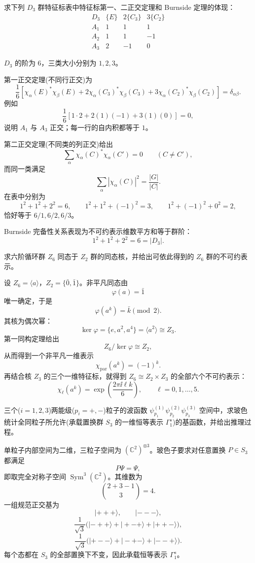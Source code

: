 \begin{question}[9 分]
求下列 $D_3$ 群特征标表中特征标第一、二正交定理和 Burnside 定理的体现：
\[
\begin{array}{c|ccc}
D_3&\{E\}&2\{C_3\}&3\{C_2\}\\\hline
A_1&1&1&1\\
A_2&1&1&-1\\
A_3&2&-1&0
\end{array}
\]
\begin{solution}
$D_3$ 的阶为 $6$，三类大小分别为 $1,2,3$。

第一正交定理(不同行正交)为
\[
\frac1{6}\left[
\chi_\alpha(E)^*\chi_\beta(E)
+2\chi_\alpha(C_3)^*\chi_\beta(C_3)
+3\chi_\alpha(C_2)^*\chi_\beta(C_2)
\right]=\delta_{\alpha\beta}.
\]
例如
\[
\frac16[1\cdot2+2(1)(-1)+3(1)(0)]=0,
\]
说明 $A_1$ 与 $A_3$ 正交；每一行的自内积都等于 $1$。

第二正交定理(不同类的列正交)给出
\[
\sum_\alpha \chi_\alpha(C)^*\chi_\alpha(C')=0\qquad(C\neq C'),
\]
而同一类满足
\[
\sum_\alpha|\chi_\alpha(C)|^2=\frac{|G|}{|C|}.
\]
在表中分别为
\[
1^2+1^2+2^2=6,\qquad
1^2+1^2+(-1)^2=3,\qquad
1^2+(-1)^2+0^2=2,
\]
恰好等于 $6/1,6/2,6/3$。

Burnside 完备性关系表现为不可约表示维数平方和等于群阶：
\[
\boxed{1^2+1^2+2^2=6=|D_3|}.
\]
\end{solution}
\end{question}

\begin{question}[8 分]
求六阶循环群 $Z_6$ 同态于 $Z_2$ 群的同态核，并给出可依此得到的 $Z_6$ 群的不可约表示。
\begin{solution}
设 $Z_6=\langle a\rangle$，$Z_2=\{\bar0,\bar1\}$。非平凡同态由
\[
\varphi(a)=\bar1
\]
唯一确定，于是
\[
\varphi(a^k)=\bar k\pmod2.
\]
其核为偶次幂：
\[
\boxed{\ker\varphi=\{e,a^2,a^4\}=\langle a^2\rangle\cong Z_3}.
\]
第一同构定理给出
\[
Z_6/\ker\varphi\cong Z_2,
\]
从而得到一个非平凡一维表示
\[
\chi_{\mathrm{par}}(a^k)=(-1)^k.
\]
再结合核 $Z_3$ 的三个一维特征标，就得到 $Z_6\cong Z_2\times Z_3$ 的全部六个不可约表示：
\[
\boxed{\chi_\ell(a^k)=\exp\!\left(\frac{2\pi\ii\ell k}{6}\right)},
\qquad \ell=0,1,\ldots,5.
\]
\end{solution}
\end{question}

\begin{question}[8 分]
三个($i=1,2,3$)两能级($p_i=+,-$)粒子的波函数
$\psi_{p_1}^{(1)}\psi_{p_2}^{(2)}\psi_{p_3}^{(3)}$ 空间中，求玻色统计全同粒子所允许(承载置换群 $S_3$ 的一维恒等表示 $\Gamma_1^s$)的基函数，并给出推理过程。
\begin{solution}
单粒子内部空间为二维，三粒子空间为 $(\mathbb C^2)^{\otimes3}$。玻色子要求对任意置换 $P\in S_3$ 都满足
\[
P\Psi=\Psi,
\]
即取完全对称子空间 $\operatorname{Sym}^3(\mathbb C^2)$。其维数为
\[
\binom{2+3-1}{3}=4.
\]
一组规范正交基为
\[
\boxed{|+++\rangle},
\qquad
\boxed{|---\rangle},
\]
\[
\boxed{\frac1{\sqrt3}\bigl(|-++\rangle+|+-+\rangle+|++-\rangle\bigr)},
\]
\[
\boxed{\frac1{\sqrt3}\bigl(|+--\rangle+|-+-\rangle+|--+\rangle\bigr)}.
\]
每个态都在 $S_3$ 的全部置换下不变，因此承载恒等表示 $\Gamma_1^s$。
\end{solution}
\end{question}

